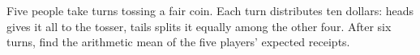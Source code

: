 Five people take turns tossing a fair coin. Each turn distributes ten dollars: heads gives it all to the tosser, tails splits it equally among the other four. After six turns, find the arithmetic mean of the five players' expected receipts.
